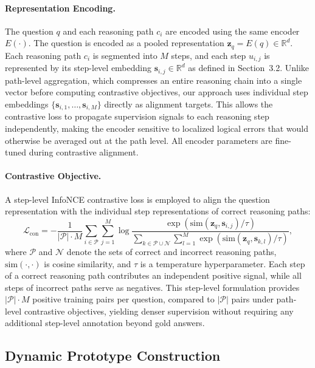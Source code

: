\documentclass[a4paper,fleqn]{cas-dc}
\begin{document}
\paragraph{Representation Encoding.}
The question $q$ and each reasoning path $c_i$ are encoded using the same encoder $E(\cdot)$.
The question is encoded as a pooled representation $\mathbf{z}_q = E(q) \in \mathbb{R}^d$.
Each reasoning path $c_i$ is segmented into $M$ steps, and each step $u_{i,j}$ is represented by its step-level embedding $\mathbf{s}_{i,j} \in \mathbb{R}^d$ as defined in Section~3.2.
Unlike path-level aggregation, which compresses an entire reasoning chain into a single vector before computing contrastive objectives, our approach uses individual step embeddings $\{\mathbf{s}_{i,1}, \ldots, \mathbf{s}_{i,M}\}$ directly as alignment targets.
This allows the contrastive loss to propagate supervision signals to each reasoning step independently, making the encoder sensitive to localized logical errors that would otherwise be averaged out at the path level.
All encoder parameters are fine-tuned during contrastive alignment.

\paragraph{Contrastive Objective.}
A step-level InfoNCE contrastive loss is employed to align the question representation with the individual step representations of correct reasoning paths:
\[
\mathcal{L}_{\text{con}} = - \frac{1}{|\mathcal{P}| \cdot M} \sum_{i \in \mathcal{P}} \sum_{j=1}^{M}
\log
\frac{
\exp \left( \text{sim}(\mathbf{z}_q, \mathbf{s}_{i,j}) / \tau \right)
}{
\sum_{k \in \mathcal{P} \cup \mathcal{N}} \sum_{l=1}^{M} \exp \left( \text{sim}(\mathbf{z}_q, \mathbf{s}_{k,l}) / \tau \right)
},
\]
where $\mathcal{P}$ and $\mathcal{N}$ denote the sets of correct and incorrect reasoning paths, $\text{sim}(\cdot,\cdot)$ is cosine similarity, and $\tau$ is a temperature hyperparameter.
Each step of a correct reasoning path contributes an independent positive signal, while all steps of incorrect paths serve as negatives.
This step-level formulation provides $|\mathcal{P}| \cdot M$ positive training pairs per question, compared to $|\mathcal{P}|$ pairs under path-level contrastive objectives, yielding denser supervision without requiring any additional step-level annotation beyond gold answers.

\subsection{Dynamic Prototype Construction}
\end{document}
